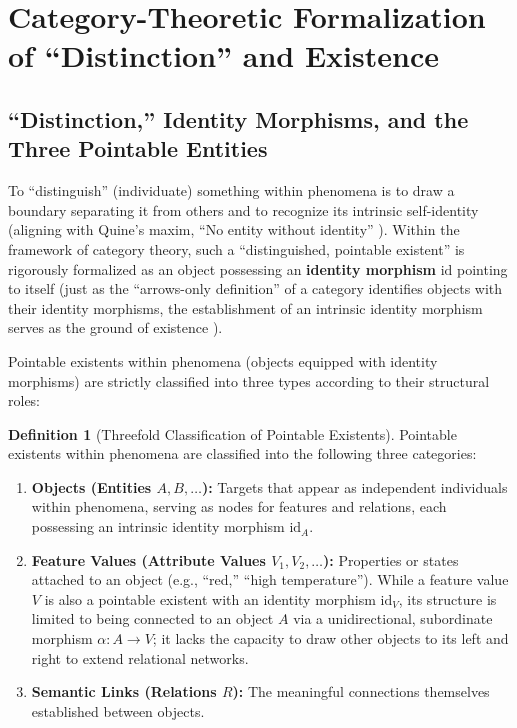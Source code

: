 \documentclass[11pt,a4paper]{article}
\theoremstyle{definition}
\newtheorem{definition}{Definition}[section]
\theoremstyle{plain}
\begin{document}
\section{Category-Theoretic Formalization of ``Distinction'' and Existence}

\subsection{``Distinction,'' Identity Morphisms, and the Three Pointable Entities}

To ``distinguish'' (individuate) something within phenomena is to draw a boundary separating it from others and to recognize its intrinsic self-identity (aligning with Quine's maxim, ``No entity without identity'' \cite{quine1969}). Within the framework of category theory, such a ``distinguished, pointable existent'' is rigorously formalized as an object possessing an \textbf{identity morphism} $\mathrm{id}$ pointing to itself (just as the ``arrows-only definition'' of a category identifies objects with their identity morphisms, the establishment of an intrinsic identity morphism serves as the ground of existence \cite{maclane1998}).

Pointable existents within phenomena (objects equipped with identity morphisms) are strictly classified into three types according to their structural roles:

\begin{definition}[Threefold Classification of Pointable Existents]
Pointable existents within phenomena are classified into the following three categories:
\begin{enumerate}
    \item \textbf{Objects (Entities $A, B, \dots$):} Targets that appear as independent individuals within phenomena, serving as nodes for features and relations, each possessing an intrinsic identity morphism $\mathrm{id}_{A}$.
    \item \textbf{Feature Values (Attribute Values $V_1, V_2, \dots$):} Properties or states attached to an object (e.g., ``red,'' ``high temperature''). While a feature value $V$ is also a pointable existent with an identity morphism $\mathrm{id}_{V}$, its structure is limited to being connected to an object $A$ via a unidirectional, subordinate morphism $\alpha: A \to V$; it lacks the capacity to draw other objects to its left and right to extend relational networks.
    \item \textbf{Semantic Links (Relations $R$):} The meaningful connections themselves established between objects.
\end{enumerate}
\end{definition}
\end{document}
